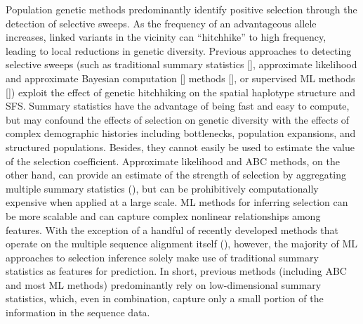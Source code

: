 Population genetic methods predominantly identify positive selection throu\-gh the detection of selective sweeps. As the frequency of an advantageous allele increases, linked variants in the vicinity can “hitchhike” to high frequency, leading to local reductions in genetic diversity. Previous approaches to detecting selective sweeps (such as traditional summary statistics [\cite{tajima_statistical_1989}], approximate likelihood and approximate Bayesian computation [] methods [\cite{peter_distinguishing_2012}], or supervised \ac{ML} methods [\cite{schrider_shic_2016, kern_diploshic_2018}]) exploit the effect of genetic hitchhiking on the spatial haplotype structure and \ac{SFS}. Summary statistics have the advantage of being fast and easy to compute, but may confound the effects of selection on genetic diversity with the effects of complex demographic histories including bottlenecks, population expansions, and structured populations. Besides, they cannot easily be used to estimate the value of the selection coefficient. Approximate likelihood and \ac{ABC} methods, on the other hand, can provide an estimate of the strength of selection by aggregating multiple summary statistics (\cite{peter_distinguishing_2012}), but can be prohibitively computationally expensive when applied at a large scale. \ac{ML} methods for inferring selection can be more scalable and can capture complex nonlinear relationships among features. With the exception of a handful of recently developed methods that operate on the multiple sequence alignment itself (\cite{flagel_unreasonable_2019,torada_imagene_2019}), however, the majority of \ac{ML} approaches to selection inference solely make use of traditional summary statistics as features for prediction. In short, previous methods (including \ac{ABC} and most \ac{ML} methods) predominantly rely on low-dimensional summary statistics, which, even in combination, capture only a small portion of the information in the sequence data.

